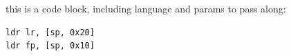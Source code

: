 
this is a code block, including language and params to pass along:

\begin{verbatim}
ldr lr, [sp, 0x20]
ldr fp, [sp, 0x10]
\end{verbatim}
